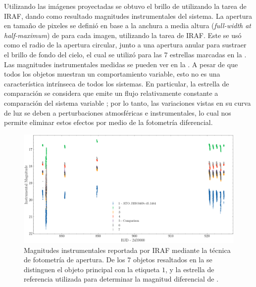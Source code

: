 Utilizando las imágenes proyectadas se obtuvo el brillo de \atoObjId utilizando
la tarea  de IRAF, dando como resultado magnitudes instrumentales
del sistema. La apertura en tamaño de pixeles se definió en base a la anchura a
media altura (\textit{full-width at half-maximum}) de \atoObjId para cada
imagen, utilizando la tarea  de IRAF. Este se usó como el radio de
la apertura circular, junto a una apertura anular para sustraer el brillo de
fondo del cielo, el cual se utilizó para las 7 estrellas marcadas en la
. Las magnitudes instrumentales medidas se pueden ver
en la . A pesar de que todos los
objetos muestran un comportamiento variable, esto no es una característica
intrínseca de todos los sistemas. En particular, la estrella de comparación se
considera que emite un flujo relativamente constante a comparación del sistema
variable \atoObjIdNoSpace; por lo tanto, las variaciones vistas en su curva de
luz se deben a perturbaciones atmosféricas e instrumentales, lo cual nos permite
eliminar estos efectos por medio de la fotometría diferencial.

\begin{figure}[!ht]
	\centering
	\includegraphics[scale=0.4]{Observaciones/Secciones/Figures/Figura Magnitud Instrumental Todas.png}
	\caption{Magnitudes instrumentales reportada por IRAF mediante la técnica de
	fotometría de apertura. De los 7 objetos resaltados en la
	 se distinguen el objeto principal \atoObjId con
	la etiqueta $1$, y la estrella de referencia utilizada para determinar la
	magnitud diferencial de \atoObjIdNoSpace. }
	\label{figuraCurvaLuzInstrumentalTodas}
\end{figure}

